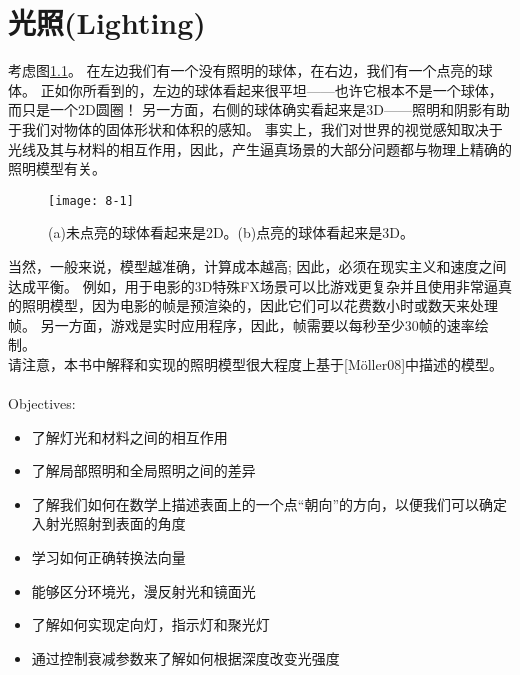 \chapter{光照(Lighting)}
\begin{flushleft}
考虑图\ref{fig:8-1}。 在左边我们有一个没有照明的球体，在右边，我们有一个点亮的球体。 正如你所看到的，左边的球体看起来很平坦——也许它根本不是一个球体，而只是一个2D圆圈！ 另一方面，右侧的球体确实看起来是3D——照明和阴影有助于我们对物体的固体形状和体积的感知。 事实上，我们对世界的视觉感知取决于光线及其与材料的相互作用，因此，产生逼真场景的大部分问题都与物理上精确的照明模型有关。
\end{flushleft}

\begin{figure}[h]
    \texttt{[image: 8-1]}
    \centering
    \caption{(a)未点亮的球体看起来是2D。(b)点亮的球体看起来是3D。}
    \label{fig:8-1}
\end{figure}

\begin{flushleft}
当然，一般来说，模型越准确，计算成本越高; 因此，必须在现实主义和速度之间达成平衡。 例如，用于电影的3D特殊FX场景可以比游戏更复杂并且使用非常逼真的照明模型，因为电影的帧是预渲染的，因此它们可以花费数小时或数天来处理帧。 另一方面，游戏是实时应用程序，因此，帧需要以每秒至少30帧的速率绘制。\\
请注意，本书中解释和实现的照明模型很大程度上基于[Möller08]中描述的模型。\\
~\\
{\large Objectives:}
\begin{itemize}
    \item 了解灯光和材料之间的相互作用
    \item 了解局部照明和全局照明之间的差异
    \item 了解我们如何在数学上描述表面上的一个点“朝向”的方向，以便我们可以确定入射光照射到表面的角度
    \item 学习如何正确转换法向量
    \item 能够区分环境光，漫反射光和镜面光
    \item 了解如何实现定向灯，指示灯和聚光灯
    \item 通过控制衰减参数来了解如何根据深度改变光强度
\end{itemize}
\end{flushleft}


